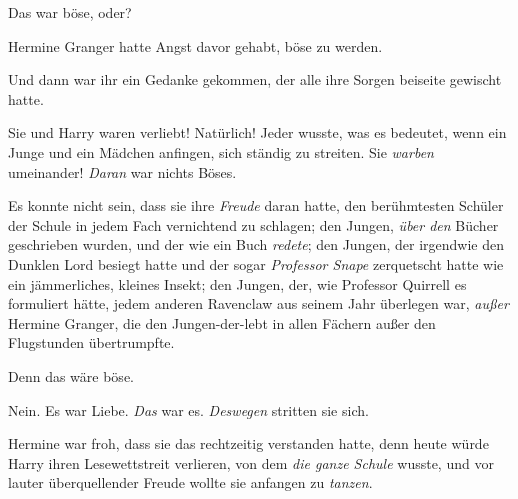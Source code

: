 Das war böse, oder?

Hermine Granger hatte Angst davor gehabt, böse zu werden.

Und dann war ihr ein Gedanke gekommen, der alle ihre Sorgen beiseite gewischt hatte.

Sie und Harry waren verliebt! Natürlich! Jeder wusste, was es bedeutet, wenn ein Junge und ein Mädchen anfingen, sich ständig zu streiten. Sie \emph{warben} umeinander! \emph{Daran} war nichts Böses.

Es konnte nicht sein, dass sie ihre \emph{Freude} daran hatte, den berühmtesten Schüler der Schule in jedem Fach vernichtend zu schlagen; den Jungen, \emph{über den} Bücher geschrieben wurden, und der wie ein Buch \emph{redete}; den Jungen, der irgendwie den Dunklen Lord besiegt hatte und der sogar \emph{Professor Snape} zerquetscht hatte wie ein jämmerliches, kleines Insekt; den Jungen, der, wie Professor Quirrell es formuliert hätte, jedem anderen Ravenclaw aus seinem Jahr überlegen war, \emph{außer} Hermine Granger, die den Jungen-der-lebt in allen Fächern außer den Flugstunden übertrumpfte.

Denn das wäre böse.

Nein. Es war Liebe. \emph{Das} war es. \emph{Deswegen} stritten sie sich.

Hermine war froh, dass sie das rechtzeitig verstanden hatte, denn heute würde Harry ihren Lesewettstreit verlieren, von dem \emph{die ganze Schule} wusste, und vor lauter überquellender Freude wollte sie anfangen zu \emph{tanzen}.

